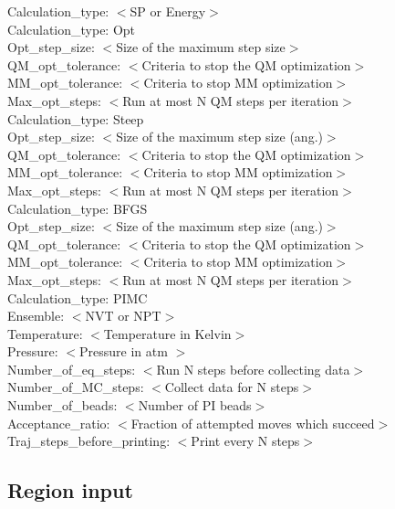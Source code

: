 \documentclass[12pt]{report}
\begin{document}
Calculation\_type: $<$SP or Energy$>$ \\

Calculation\_type: Opt \\
Opt\_step\_size: $<$Size of the maximum step size$>$ \\
QM\_opt\_tolerance: $<$Criteria to stop the QM optimization$>$\\
MM\_opt\_tolerance: $<$Criteria to stop MM optimization$>$ \\
Max\_opt\_steps: $<$Run at most N QM steps per iteration$>$ \\

Calculation\_type: Steep \\
Opt\_step\_size: $<$Size of the maximum step size (ang.)$>$ \\
QM\_opt\_tolerance: $<$Criteria to stop the QM optimization$>$\\
MM\_opt\_tolerance: $<$Criteria to stop MM optimization$>$ \\
Max\_opt\_steps: $<$Run at most N QM steps per iteration$>$ \\

Calculation\_type: BFGS \\
Opt\_step\_size: $<$Size of the maximum step size (ang.)$>$ \\
QM\_opt\_tolerance: $<$Criteria to stop the QM optimization$>$\\
MM\_opt\_tolerance: $<$Criteria to stop MM optimization$>$ \\
Max\_opt\_steps: $<$Run at most N QM steps per iteration$>$ \\

Calculation\_type: PIMC \\
Ensemble: $<$NVT or NPT$>$ \\
Temperature: $<$Temperature in Kelvin$>$ \\
Pressure: $<$Pressure in atm $>$ \\
Number\_of\_eq\_steps: $<$Run N steps before collecting data$>$ \\
Number\_of\_MC\_steps: $<$Collect data for N steps$>$ \\
Number\_of\_beads: $<$Number of PI beads$>$ \\
Acceptance\_ratio: $<$Fraction of attempted moves which succeed$>$ \\
Traj\_steps\_before\_printing: $<$Print every N steps$>$ \\

\subsection{Region input}
\end{document}
